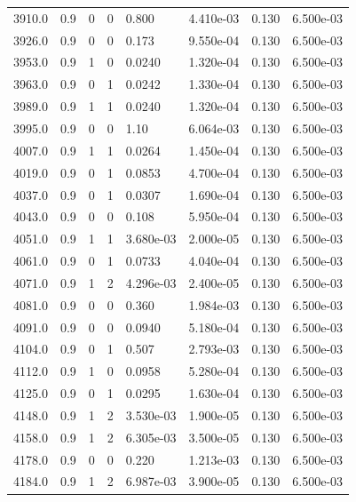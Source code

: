 \documentclass[preview]{standalone}
\begin{document}
{{{{{{{{\begin{tabular}{L{1.2cm}C{1.2cm} C{0.3cm}C{0.5cm} C{1.4cm}C{1.4cm} C{1.4cm}C{1.4cm}}
  3910.0  &   0.9  & 0     &  0 &  0.800  & 4.410e-03  & 0.130 &  6.500e-03   \\ 
  3926.0  &   0.9  & 0     &  0 &  0.173  & 9.550e-04  & 0.130 &  6.500e-03   \\ 
  3953.0  &   0.9  & 1     &  0 &  0.0240  & 1.320e-04  & 0.130 &  6.500e-03   \\ 
  3963.0  &   0.9  & 0     &  1 &  0.0242  & 1.330e-04  & 0.130 &  6.500e-03   \\ 
  3989.0  &   0.9  & 1     &  1 &  0.0240  & 1.320e-04  & 0.130 &  6.500e-03   \\ 
  3995.0  &   0.9  & 0     &  0 &  1.10  & 6.064e-03  & 0.130 &  6.500e-03   \\ 
  4007.0  &   0.9  & 1     &  1 &  0.0264  & 1.450e-04  & 0.130 &  6.500e-03   \\ 
  4019.0  &   0.9  & 0     &  1 &  0.0853  & 4.700e-04  & 0.130 &  6.500e-03   \\ 
  4037.0  &   0.9  & 0     &  1 &  0.0307  & 1.690e-04  & 0.130 &  6.500e-03   \\ 
  4043.0  &   0.9  & 0     &  0 &  0.108  & 5.950e-04  & 0.130 &  6.500e-03   \\ 
  4051.0  &   0.9  & 1     &  1 &  3.680e-03  & 2.000e-05  & 0.130 &  6.500e-03   \\ 
  4061.0  &   0.9  & 0     &  1 &  0.0733  & 4.040e-04  & 0.130 &  6.500e-03   \\ 
  4071.0  &   0.9  & 1     &  2 &  4.296e-03  & 2.400e-05  & 0.130 &  6.500e-03   \\ 
  4081.0  &   0.9  & 0     &  0 &  0.360  & 1.984e-03  & 0.130 &  6.500e-03   \\ 
  4091.0  &   0.9  & 0     &  0 &  0.0940  & 5.180e-04  & 0.130 &  6.500e-03   \\ 
  4104.0  &   0.9  & 0     &  1 &  0.507  & 2.793e-03  & 0.130 &  6.500e-03   \\ 
  4112.0  &   0.9  & 1     &  0 &  0.0958  & 5.280e-04  & 0.130 &  6.500e-03   \\ 
  4125.0  &   0.9  & 0     &  1 &  0.0295  & 1.630e-04  & 0.130 &  6.500e-03   \\ 
  4148.0  &   0.9  & 1     &  2 &  3.530e-03  & 1.900e-05  & 0.130 &  6.500e-03   \\ 
  4158.0  &   0.9  & 1     &  2 &  6.305e-03  & 3.500e-05  & 0.130 &  6.500e-03   \\ 
  4178.0  &   0.9  & 0     &  0 &  0.220  & 1.213e-03  & 0.130 &  6.500e-03   \\ 
  4184.0  &   0.9  & 1     &  2 &  6.987e-03  & 3.900e-05  & 0.130 &  6.500e-03   \\ 

\end{tabular}}}}}}}}}
\end{document}
